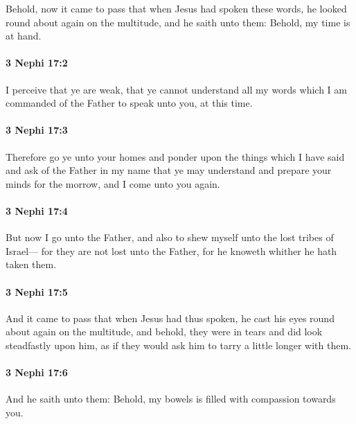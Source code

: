 			Behold, now it came to pass that
			when Jesus had spoken these words,
			he looked round about again on the multitude,
			and he saith unto them:
			Behold, my time is at hand.

		\paragraph{3 Nephi 17:2} %
			\label{3NEPHI-17-2}

			I perceive that ye are weak,
			that ye cannot understand all my words
			which I am commanded of the Father to speak unto you,
			at this time.

		\paragraph{3 Nephi 17:3} %
			\label{3NEPHI-17-3}

			Therefore go ye unto your homes
			and ponder upon the things which I have said
			and ask of the Father in my name
			that ye may understand and prepare your minds for the morrow,
			and I come unto you again.

		\paragraph{3 Nephi 17:4} %
			\label{3NEPHI-17-4}

			But now I go unto the Father,
			and also to shew myself unto the lost tribes of Israel---
			for they are not lost unto the Father,
			for he knoweth whither he hath taken them.

		\paragraph{3 Nephi 17:5} %
			\label{3NEPHI-17-5}

			And it came to pass that when Jesus had thus spoken,
			he cast his eyes round about again on the multitude,
			and behold, they were in tears
			and did look steadfastly upon him,
			as if they would ask him to tarry a little longer with them.

		\paragraph{3 Nephi 17:6} %
			\label{3NEPHI-17-6}

			And he saith unto them:
			Behold, my bowels is filled with compassion towards you.

